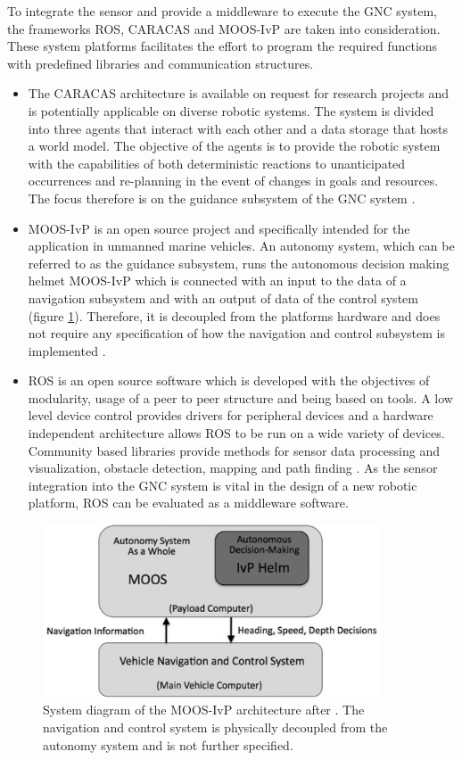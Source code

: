 To integrate the sensor and provide a middleware to execute the \ac{GNC} system, the frameworks \ac{ROS}, \ac{CARACAS} and \ac{MOOS-IvP} are taken into consideration. These system platforms facilitates the effort to program the required functions with predefined libraries and communication structures. 
\begin{itemize}
	\item The \ac{CARACAS} architecture is available on request for research projects and is potentially applicable on diverse robotic systems. The system is divided into three agents that interact with each other and a data storage that hosts a world model. The objective of the agents is to provide the robotic system with the capabilities of both deterministic reactions to unanticipated occurrences and re-planning in the event of changes in goals and resources. The focus therefore is on the guidance subsystem of the \ac{GNC} system \cite{CARACAS}.
	\item \ac{MOOS-IvP} is an open source project and specifically intended for the application in unmanned marine vehicles. An autonomy system, which can be referred to as the guidance subsystem, runs the autonomous decision making helmet \ac{MOOS-IvP} which is connected with an input to the data of a navigation subsystem and with an output of data of the control system (figure \ref{fig_MOOS}). Therefore, it is decoupled from the platforms hardware and does not require any specification of how the navigation and control subsystem is implemented \cite{MOOS}.
	\item  \ac{ROS} is an open source software which is developed with the objectives of modularity, usage of a peer to peer structure and being based on tools. A low level device control provides drivers for peripheral devices and a hardware independent architecture allows \ac{ROS} to be run on a wide variety of devices. Community based libraries provide methods for sensor data processing and visualization, obstacle detection, mapping and path finding \cite{ROS}. As the sensor integration into the \ac{GNC} system is vital in the design of a new robotic platform, \ac{ROS} can be evaluated as a middleware software.
\end{itemize}	

\begin{figure}
	\begin{centering}
		\includegraphics[width=10cm,keepaspectratio]{Bilder/MOOS.PNG}
		\caption{System diagram of the \ac{MOOS-IvP} architecture after \cite{MOOS}. The navigation and control system is physically decoupled from the autonomy system and is not further specified.}
		\label{fig_MOOS}%
	\end{centering}
\end{figure}

